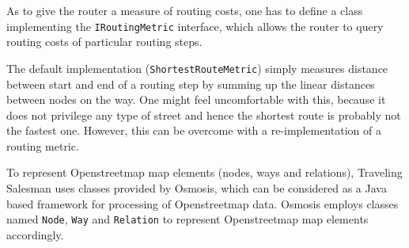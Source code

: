 \begin{itemize}
		As to give the router a  measure of routing costs, one has to define a class implementing the \texttt{IRoutingMetric} interface, which allows the router to query routing costs of particular routing steps.\newline
		
		The default implementation (\texttt{ShortestRouteMetric}) simply measures distance between start and end of a routing step by summing up the linear distances between nodes on the way. One might feel uncomfortable with this, because it does not privilege any type of street and hence the shortest route is probably not the fastest one. However, this can be overcome with a re-implementation of a routing metric.
	
\end{itemize}

To represent Openstreetmap map elements (nodes, ways and relations), Traveling Salesman uses classes provided by Osmosis, which can be considered as a Java based framework for processing of Openstreetmap data. Osmosis employs classes named \texttt{Node}, \texttt{Way} and \texttt{Relation} to represent Openstreetmap map elements accordingly.

